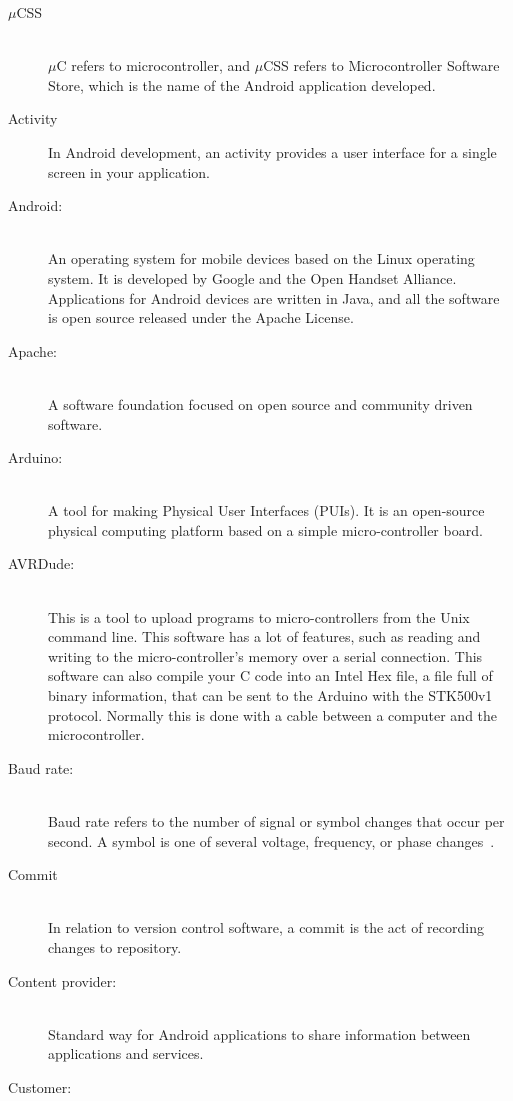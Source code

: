 \begin{description}
	\item[$\mu$CSS] \hfill \\
		$\mu$C refers to microcontroller, and $\mu$CSS refers to Microcontroller Software Store, which is the name of the Android application developed.
	\item[Activity]
		In Android development, an activity provides a user interface for a single screen in your application.
	\item[Android:]\hfill \\
		An operating system for mobile devices based on the Linux operating system. It is developed by Google and the Open Handset Alliance. Applications for Android devices are written in Java, and all the software is open source released under the Apache License.
	\item[Apache:] \hfill \\
		A software foundation focused on open source and community driven software.
	\item[Arduino:]\hfill \\
		A tool for making Physical User Interfaces (PUIs). It is an open-source physical computing platform based on a simple micro-controller board.
	\item[AVRDude:]\hfill \\
		This is a tool to upload programs to micro-controllers from the Unix command line. This software has a lot of features, such as reading and writing to the micro-controller's memory over a serial connection. This software can also compile your C code into an Intel Hex file, a file full of binary information, that can be sent to the Arduino with the STK500v1 protocol. Normally this is done with a cable between a computer and the microcontroller.
	\item[Baud rate:]\hfill \\
		Baud rate refers to the number of signal or symbol changes that occur per second. A symbol is one of several voltage, frequency, or phase changes~\cite{baudrate}.
	\item[Commit]\hfill \\
		In relation to version control software, a commit is the act of recording changes to repository.
	\item[Content provider:]\hfill \\
		Standard way for Android applications to share information between applications and services.
	\item[Customer:]\hfill \\

\end{description}
